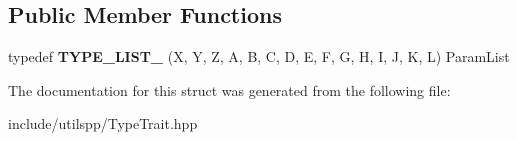 \subsection*{Public Member Functions}
\begin{DoxyCompactItemize}
\item 
\hypertarget{structutilspp_1_1PointerOnMemberFunction_3_01W_07V_1_1_5_08_07X_00_01Y_00_01Z_00_01A_00_01B_00_07161b1228eaaa251377e300b0722bf86_a17ef3f6099f70b7090262cd477e627a9}{typedef {\bfseries T\-Y\-P\-E\-\_\-\-L\-I\-S\-T\-\_} (X, Y, Z, A, B, C, D, E, F, G, H, I, J, K, L) Param\-List}\label{structutilspp_1_1PointerOnMemberFunction_3_01W_07V_1_1_5_08_07X_00_01Y_00_01Z_00_01A_00_01B_00_07161b1228eaaa251377e300b0722bf86_a17ef3f6099f70b7090262cd477e627a9}

\end{DoxyCompactItemize}


The documentation for this struct was generated from the following file\-:\begin{DoxyCompactItemize}
\item 
include/utilspp/Type\-Trait.\-hpp\end{DoxyCompactItemize}
